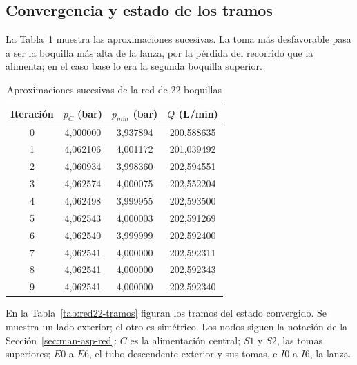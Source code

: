\subsection{Convergencia y estado de los tramos}

La Tabla~\ref{tab:red22-iteraciones} muestra las aproximaciones sucesivas. La toma más desfavorable pasa a ser la boquilla más alta de la lanza, por la pérdida del recorrido que la alimenta; en el caso base lo era la segunda boquilla superior.

\begin{table}[htbp]
\centering\small\singlespacing
\caption{Aproximaciones sucesivas de la red de 22 boquillas}
\label{tab:red22-iteraciones}
\begin{tabular}{cccc}
\toprule
\textbf{Iteración} & \textbf{$p_C$ (bar)} & \textbf{$p_{mín}$ (bar)} & \textbf{$Q$ (L/min)}\\
\midrule
0 & 4,000000 & 3,937894 & 200,588635\\
1 & 4,062106 & 4,001172 & 201,039492\\
2 & 4,060934 & 3,998360 & 202,594551\\
3 & 4,062574 & 4,000075 & 202,552204\\
4 & 4,062498 & 3,999955 & 202,593500\\
5 & 4,062543 & 4,000003 & 202,591269\\
6 & 4,062540 & 3,999999 & 202,592400\\
7 & 4,062541 & 4,000000 & 202,592311\\
8 & 4,062541 & 4,000000 & 202,592343\\
9 & 4,062541 & 4,000000 & 202,592340\\
\bottomrule
\end{tabular}
\end{table}

En la Tabla~\ref{tab:red22-tramos} figuran los tramos del estado convergido. Se muestra un lado exterior; el otro es simétrico. Los nodos siguen la notación de la Sección~\ref{sec:man-asp-red}: $C$ es la alimentación central; $S1$ y $S2$, las tomas superiores; $E0$ a $E6$, el tubo descendente exterior y sus tomas, e $I0$ a $I6$, la lanza.

